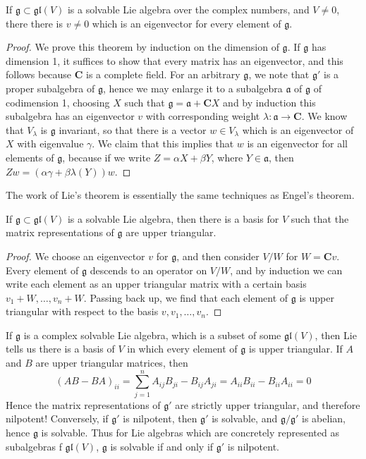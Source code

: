 \begin{lemma}
    If $\mathfrak{g} \subset \mathfrak{gl}(V)$ is a solvable Lie algebra over the complex numbers, and $V \neq 0$, there there is $v \neq 0$ which is an eigenvector for every element of $\mathfrak{g}$.
\end{lemma}
\begin{proof}
    We prove this theorem by induction on the dimension of $\mathfrak{g}$. If $\mathfrak{g}$ has dimension 1, it suffices to show that every matrix has an eigenvector, and this follows because $\mathbf{C}$ is a complete field. For an arbitrary $\mathfrak{g}$, we note that $\mathfrak{g}'$ is a proper subalgebra of $\mathfrak{g}$, hence we may enlarge it to a subalgebra $\mathfrak{a}$ of $\mathfrak{g}$ of codimension 1, choosing $X$ such that $\mathfrak{g} = \mathfrak{a} + \mathbf{C} X$ and by induction this subalgebra has an eigenvector $v$ with corresponding weight $\lambda: \mathfrak{a} \to \mathbf{C}$. We know that $V_\lambda$ is $\mathfrak{g}$ invariant, so that there is a vector $w \in V_\lambda$ which is an eigenvector of $X$ with eigenvalue $\gamma$. We claim that this implies that $w$ is an eigenvector for all elements of $\mathfrak{g}$, because if we write $Z = \alpha X + \beta Y$, where $Y \in \mathfrak{a}$, then $Zw = (\alpha \gamma + \beta \lambda(Y))w$.
\end{proof}

The work of Lie's theorem is essentially the same techniques as Engel's theorem.

\begin{theorem}
    If $\mathfrak{g} \subset \mathfrak{gl}(V)$ is a solvable Lie algebra, then there is a basis for $V$ such that the matrix representations of $\mathfrak{g}$ are upper triangular.
\end{theorem}
\begin{proof}
    We choose an eigenvector $v$ for $\mathfrak{g}$, and then consider $V/W$ for $W = \mathbf{C}v$. Every element of $\mathfrak{g}$ descends to an operator on $V/W$, and by induction we can write each element as an upper triangular matrix with a certain basis $v_1 + W, \dots, v_n + W$. Passing back up, we find that each element of $\mathfrak{g}$ is upper triangular with respect to the basis $v, v_1, \dots, v_n$.
\end{proof}

If $\mathfrak{g}$ is a complex solvable Lie algebra, which is a subset of some $\mathfrak{gl}(V)$, then Lie tells us there is a basis of $V$ in which every element of $\mathfrak{g}$ is upper triangular. If $A$ and $B$ are upper triangular matrices, then
%
\[ (AB - BA)_{ii} = \sum_{j = 1}^n A_{ij}B_{ji} - B_{ij}A_{ji} = A_{ii}B_{ii} - B_{ii}A_{ii} = 0 \]
%
Hence the matrix representations of $\mathfrak{g}'$ are strictly upper triangular, and therefore nilpotent! Conversely, if $\mathfrak{g}'$ is nilpotent, then $\mathfrak{g}'$ is solvable, and $\mathfrak{g}/\mathfrak{g}'$ is abelian, hence $\mathfrak{g}$ is solvable. Thus for Lie algebras which are concretely represented as subalgebras f $\mathfrak{gl}(V)$, $\mathfrak{g}$ is solvable if and only if $\mathfrak{g}'$ is nilpotent.


